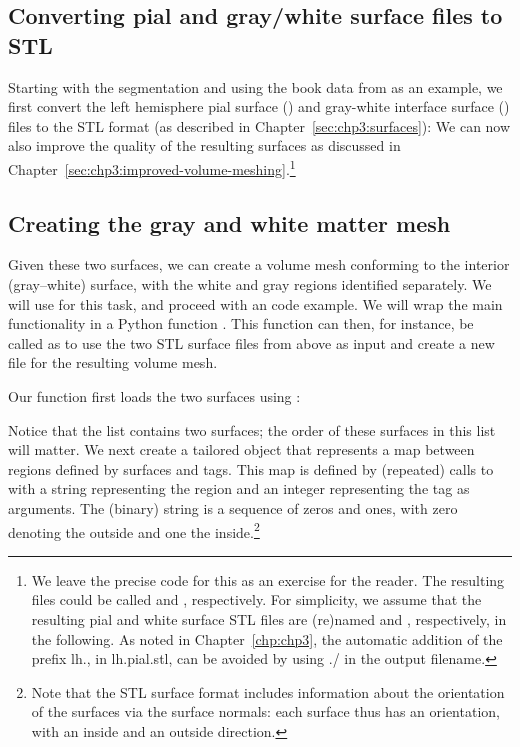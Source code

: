 \subsection{Converting pial and gray/white surface files to STL}
Starting with the \freesurfer{} segmentation and using the book data
from  as an example, we first convert the
left hemisphere pial surface () and gray-white interface
surface () files to the STL format (as described in
Chapter~\ref{sec:chp3:surfaces}):
\noindent We can now also improve the quality of the resulting
surfaces as discussed in
Chapter~\ref{sec:chp3:improved-volume-meshing}.\footnote{We leave the
  precise code for this as an exercise for the reader. The resulting
  files could be called  and
  , respectively. For simplicity, we assume that the
  resulting pial and white surface STL files are (re)named
   and , respectively, in the following. As 
  noted in Chapter~\ref{chp:chp3}, the automatic addition of the prefix lh., in
  lh.pial.stl, can be avoided by using ./ in the output filename.}

\subsection{Creating the gray and white matter mesh}
\label{sec:chp4:tools:gray-white:mesh-creation}
Given these two surfaces, we can create a volume mesh conforming to
the interior (gray--white) surface, with the white and gray regions
identified separately. We will use \svmtk{} for this task, and
proceed with an \svmtk{} code example. We will wrap the main
functionality in a Python function
. This function can then, for instance,
be called as
to use the two STL surface files from above as input and create a new
file  for the resulting volume mesh.

Our function first loads the two surfaces using \svmtk{}:

\noindent Notice that the list  contains 
two surfaces; the order of these surfaces in this list will matter. We next 
create a tailored \svmtk{}  object that represents 
a map between regions defined by surfaces and tags. This map is defined by
(repeated) calls to  with a string representing the
region and an integer representing the tag as arguments. The (binary)
string is a sequence of zeros and ones, with zero denoting the outside
and one the inside.\footnote{Note that the STL surface 
format includes information about the orientation of the surfaces via the 
surface normals: each surface thus has an orientation, with an inside and an 
outside direction.}

